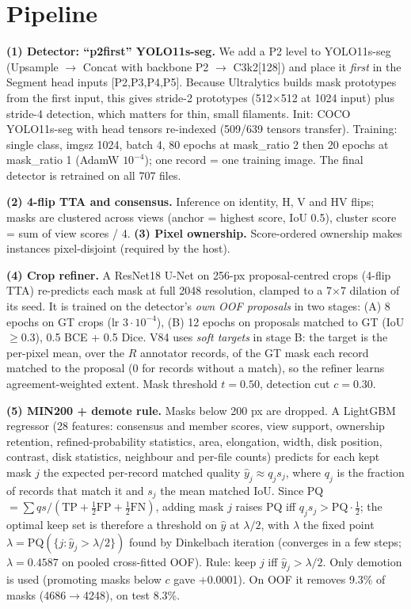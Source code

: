 \documentclass[10pt,twocolumn]{article}
\begin{document}
\section{Pipeline}
\textbf{(1) Detector: ``p2first'' YOLO11s-seg.} We add a P2 level to YOLO11s-seg (Upsample $\to$ Concat with
backbone P2 $\to$ C3k2[128]) and place it \emph{first} in the Segment head inputs [P2,P3,P4,P5]. Because
Ultralytics builds mask prototypes from the first input, this gives stride-2 prototypes (512$\times$512 at
1024 input) plus stride-4 detection, which matters for thin, small filaments. Init: COCO YOLO11s-seg with
head tensors re-indexed (509/639 tensors transfer). Training: single class, imgsz 1024, batch 4, 80 epochs at
mask\_ratio 2 then 20 epochs at mask\_ratio 1 (AdamW $10^{-4}$); one record = one training image. The
final detector is retrained on all 707 files.

\textbf{(2) 4-flip TTA and consensus.} Inference on identity, H, V and HV flips; masks are clustered across
views (anchor = highest score, IoU 0.5), cluster score = sum of view scores / 4. \textbf{(3) Pixel ownership.}
Score-ordered ownership makes instances pixel-disjoint (required by the host).

\textbf{(4) Crop refiner.} A ResNet18 U-Net on 256-px proposal-centred crops (4-flip TTA) re-predicts each mask
at full 2048 resolution, clamped to a 7$\times$7 dilation of its seed. It is trained on the detector's
\emph{own OOF proposals} in two stages: (A) 8 epochs on GT crops (lr $3\cdot10^{-4}$), (B) 12 epochs on
proposals matched to GT (IoU$\ge$0.3), 0.5 BCE + 0.5 Dice. V84 uses \emph{soft targets} in stage B: the target is the per-pixel mean, over the $R$ annotator records, of the GT mask each record matched to the
proposal (0 for records without a match), so the refiner learns agreement-weighted extent. Mask threshold $t=0.50$, detection cut $c=0.30$.

\textbf{(5) MIN200 + demote rule.} Masks below 200 px are dropped. A LightGBM regressor (28 features:
consensus and member scores, view support, ownership retention, refined-probability statistics, area, elongation, width, disk position, contrast, disk statistics,
neighbour and per-file counts) predicts for each kept mask $j$ the expected per-record matched quality
$\hat y_j\approx q_j s_j$, where $q_j$ is the fraction of records that match it and $s_j$ the mean matched IoU.
Since PQ $=\sum q s/(\text{TP}+\tfrac12\text{FP}+\tfrac12\text{FN})$, adding mask $j$ raises PQ iff
$q_j s_j > \mathrm{PQ}\cdot\tfrac12$; the optimal keep set is therefore a threshold on $\hat y$ at $\lambda/2$, with
$\lambda$ the fixed point $\lambda=\mathrm{PQ}(\{j:\hat y_j>\lambda/2\})$ found by Dinkelbach iteration
(converges in a few steps; $\lambda=0.4587$ on pooled cross-fitted OOF). Rule: keep $j$ iff $\hat y_j>\lambda/2$.
Only demotion is used (promoting masks below $c$ gave +0.0001). On OOF it removes 9.3\% of masks
(4686$\to$4248), on test 8.3\%.
\end{document}
